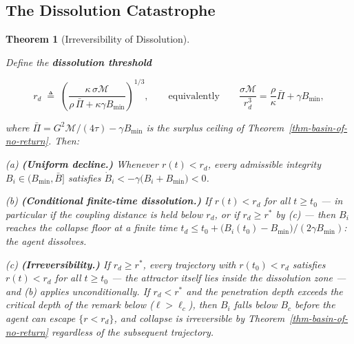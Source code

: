 \documentclass[11pt]{article}
\theoremstyle{plain}
\newtheorem{theorem}{Theorem}
\theoremstyle{definition}
\theoremstyle{remark}
\let\origsubsection\subsection
\renewcommand{\subsection}{\needspace{7\baselineskip}\origsubsection}
\begin{document}
\subsection{The Dissolution
Catastrophe}\label{the-dissolution-catastrophe}

\begin{theorem}[Irreversibility of Dissolution]
\label{thm-irreversibility-dissolution}

Define the \textbf{dissolution threshold}

$$r_d \;\triangleq\; \left(\frac{\kappa\, \sigma \mathcal{M}}{\rho\, \bar{\Pi} + \kappa \gamma B_{\min}}\right)^{1/3}, \qquad \text{equivalently} \qquad \frac{\sigma\mathcal{M}}{r_d^3} = \frac{\rho}{\kappa}\bar{\Pi} + \gamma B_{\min},$$

where $\bar{\Pi} = G^2\mathcal{M}/(4\tau) - \gamma B_{\min}$ is the surplus ceiling of Theorem~\ref{thm-basin-of-no-return}. Then:

(a) \textbf{(Uniform decline.)} Whenever $r(t) < r_d$, every admissible integrity $B_i \in (B_{\min}, \bar{B}]$ satisfies $\dot{B}_i < -\gamma\bigl(B_i + B_{\min}\bigr) < 0$.

(b) \textbf{(Conditional finite-time dissolution.)} If $r(t) < r_d$ for all $t \geq t_0$ — in particular if the coupling distance is held below $r_d$, or if $r_d \geq r^*$ by (c) — then $B_i$ reaches the collapse floor at a finite time $t_d \leq t_0 + \bigl(B_i(t_0) - B_{\min}\bigr)/(2\gamma B_{\min})$: the agent dissolves.

(c) \textbf{(Irreversibility.)} If $r_d \geq r^*$, every trajectory with $r(t_0) < r_d$ satisfies $r(t) < r_d$ for all $t \geq t_0$ — the attractor itself lies inside the dissolution zone — and (b) applies unconditionally. If $r_d < r^*$ and the penetration depth exceeds the critical depth of the remark below ($\ell > \ell_c$), then $B_i$ falls below $B_c$ before the agent can escape $\{r < r_d\}$, and collapse is irreversible by Theorem~\ref{thm-basin-of-no-return} regardless of the subsequent trajectory.
\end{theorem}
\end{document}
